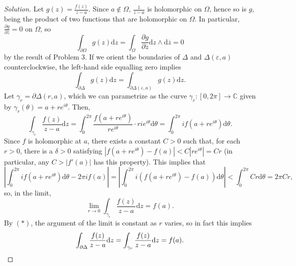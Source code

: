 \documentclass[10pt]{article}
\providecommand{\ol}{\overline}
\newcommand{\dd}{\mathrm{d}}
\providecommand{\eps}{\varepsilon}
\providecommand{\CC}{\mathbb C}
\newenvironment{soln}{\begin{proof}[Solution]}{\end{proof}}
\providecommand{\abs}[1]{\left\lvert #1\right\rvert}
\begin{document}
\begin{soln}
    Let $g(z) = \frac{f(z)}{z-a}$. Since $a\notin\Omega$,
    $\frac 1{z-a}$ is holomorphic on $\Omega$, hence so is $g$,
    being the product of two functions that are holomorphic on $\Omega$.
    In particular, $\frac{\partial g}{\partial\ol z} = 0$ on $\Omega$, so
    \begin{equation*}
	\int_{\partial\Omega}g(z)\dd z
	= \int_\Omega \frac{\partial g}{\partial\ol z}
	\dd z\wedge\dd\ol z = 0
    \end{equation*}
    by the result of Problem 3.
    If we orient the boundaries of $\Delta$ and $\Delta(\eps,a)$
    counterclockwise, the left-hand side equalling zero implies
    \begin{equation*}
	\int_{\partial\Delta} g(z)\dd z
	= \int_{\partial\Delta(\eps,a)}g(z)\dd z.\tag{$*$}
    \end{equation*}
    Let $\gamma_r = \partial\Delta(r,a)$,
    which we can parametrize as the curve
    $\gamma_r\colon[0,2\pi]\to\CC$ given by
    $\gamma_r(\theta) = a + re^{i\theta}$. Then,
    \begin{equation*}
	\int_{\gamma_r} \frac{f(z)}{z-a}\dd z
	= \int_0^{2\pi} \frac{f(a + r e^{i\theta})}
	{r e^{i\theta}}\cdot rie^{i\theta}\dd\theta
	= \int_0^{2\pi} if(a + re^{i\theta})\dd\theta.
    \end{equation*}
    Since $f$ is holomorphic at $a$, there exists a constant $C>0$
    such that, for each $r>0$, there is a $\delta>0$ satisfying
    $\abs{f(a+re^{i\theta}) - f(a)} < C\abs{re^{i\theta}} = Cr$
    (in particular, any $C > \abs{f'(a)}$ has this property).
    This implies that
    \begin{equation*}
	\abs{\int_0^{2\pi} if(a+re^{i\theta})\dd\theta
	- 2\pi if(a)}
	= \abs{\int_0^{2\pi} i(f(a + re^{i\theta}) - f(a))\dd\theta}
	< \int_0^{2\pi} Cr\dd\theta = 2\pi Cr,
    \end{equation*}
    so, in the limit,
    \begin{equation*}
	\lim_{r\to 0}\int_{\gamma_r} \frac{f(z)}{z-a}\dd z = f(a).
    \end{equation*}
    By $(*)$, the argument of the limit is constant as $r$ varies,
    so in fact this implies
    \begin{equation*}
	\int_{\partial\Delta}\frac{f(z)}{z-a}\dd z
	= \int_{\gamma_r}\frac{f(z)}{z-a}\dd z = f(a).\qedhere
    \end{equation*}
\end{soln}
\end{document}
